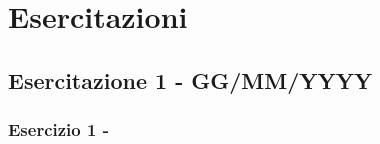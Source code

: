 \documentclass[../main.tex]{subfiles}
\begin{document}
\clearpage
\thispagestyle{empty}
\vspace*{7cm}
\section{Esercitazioni}
\vspace*{1.5cm}



\subsection{Esercitazione 1 - GG/MM/YYYY}


\subsubsection{Esercizio 1 - }
\end{document}
